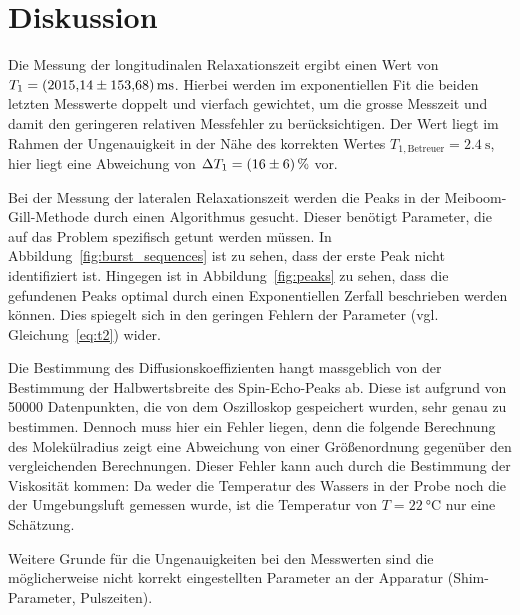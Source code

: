 \section{Diskussion}%
\label{sec:diskussion}
Die Messung der longitudinalen Relaxationszeit
ergibt einen Wert von $T_1 = \SI{2015.14 \pm 153.68}{\milli\second}$.
Hierbei werden im exponentiellen Fit die beiden letzten Messwerte doppelt und vierfach gewichtet,
um die grosse Messzeit und damit den geringeren relativen Messfehler zu berücksichtigen.
Der Wert liegt im Rahmen der Ungenauigkeit in der Nähe des korrekten Wertes
$T_{1, \text{Betreuer}} = \SI{2.4}{\second}$\cite{t1betreuer},
hier liegt eine Abweichung von $\Delta T_1 = \SI{16\pm6}{\percent}$ vor.

Bei der Messung der lateralen Relaxationszeit werden die Peaks in der Meiboom-Gill-Methode
durch einen Algorithmus gesucht.
Dieser benötigt Parameter, die auf das Problem spezifisch getunt werden müssen.
In Abbildung~\ref{fig:burst_sequences} ist zu sehen, dass der erste Peak nicht identifiziert ist.
Hingegen ist in Abbildung~\ref{fig:peaks} zu sehen, dass die gefundenen Peaks
optimal durch einen Exponentiellen Zerfall beschrieben werden können.
Dies spiegelt sich in den geringen Fehlern der Parameter (vgl. Gleichung~\eqref{eq:t2}) wider.

Die Bestimmung des Diffusionskoeffizienten hangt massgeblich von der Bestimmung der Halbwertsbreite des
Spin-Echo-Peaks ab.
Diese ist aufgrund von \num{50000} Datenpunkten, die von dem Oszilloskop gespeichert wurden, sehr genau zu bestimmen.
Dennoch muss hier ein Fehler liegen, denn die folgende Berechnung des Molekülradius
zeigt eine Abweichung von einer Größenordnung gegenüber den vergleichenden Berechnungen.
Dieser Fehler kann auch durch die Bestimmung der Viskosität kommen:
Da weder die Temperatur des Wassers in der Probe noch die der Umgebungsluft gemessen wurde,
ist die Temperatur von $T = \SI{22}{\celsius}$ nur eine Schätzung.

Weitere Grunde für die Ungenauigkeiten bei den Messwerten sind die
möglicherweise nicht korrekt eingestellten Parameter an der Apparatur
(Shim-Parameter, Pulszeiten).
